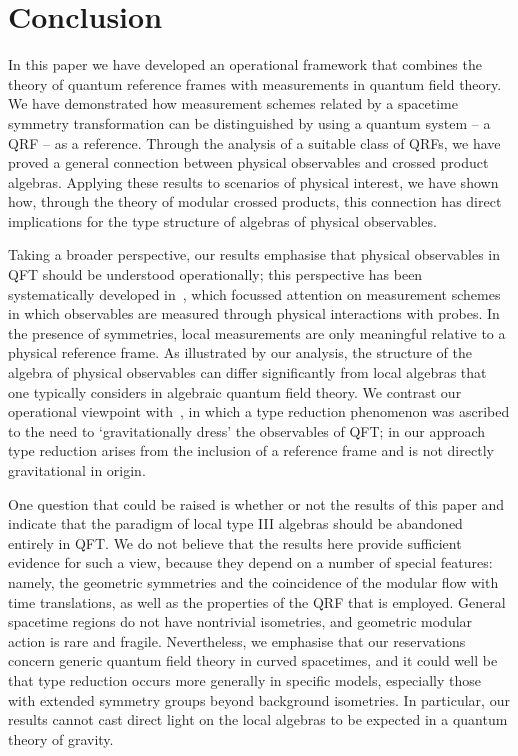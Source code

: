 \documentclass[sn-mathphys-num]{sn-jnl}%
\numberwithin{equation}{section}
\theoremstyle{thmstyleone}%
\theoremstyle{thmstyletwo}%
\theoremstyle{thmstylethree}%
\begin{document}
\section{Conclusion}

In this paper we have developed an operational framework that combines the theory of quantum reference frames with measurements in quantum field theory. We have demonstrated how measurement schemes related by a spacetime symmetry transformation can be distinguished by using a quantum system -- a QRF -- as a reference. Through the analysis of a suitable class of QRFs, we have proved a general connection between physical observables and crossed product algebras. Applying these results to scenarios of physical interest, we have shown how, through the theory of modular crossed products, this connection has direct implications for the type structure of algebras of physical observables.

Taking a broader perspective, our results emphasise that physical observables in QFT should be understood operationally; this perspective has been systematically developed in~\cite{FewVer_QFLM:2018},
which focussed attention on measurement schemes in which observables are measured through physical interactions with probes. In the presence of symmetries, 
local measurements are only meaningful relative to a physical reference frame.  As illustrated by our analysis, the structure of the algebra of physical observables can differ significantly from local algebras that one typically considers in algebraic quantum field theory. We contrast our operational viewpoint with~\cite{chandrasekaran2023algebra}, in which a type reduction phenomenon was ascribed to the need to `gravitationally dress' the observables of QFT; in our approach type reduction arises from the inclusion of a reference frame and is not directly gravitational in origin.

One question that could be raised is whether or not the results of this paper and~\cite{chandrasekaran2023algebra} indicate that the paradigm of local type III algebras should be abandoned entirely in QFT. We do not believe that the results here provide sufficient evidence for such a view, because they depend on a number of special features: namely, the geometric symmetries and the coincidence of the modular flow with time translations, as well as the properties of the QRF that is employed. General spacetime regions do not have nontrivial isometries, and geometric modular action is rare and fragile. Nevertheless, we emphasise that our reservations concern generic quantum field theory in curved spacetimes, and it could well be that type reduction occurs more generally in specific models, especially those with extended symmetry groups beyond background isometries. In particular, our results cannot cast direct light on the local algebras to be expected in a quantum theory of gravity.
\end{document}
